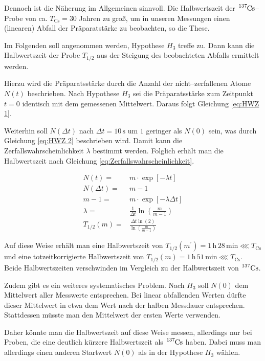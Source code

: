 \documentclass[12pt,a4paper]{scrartcl}
\numberwithin{equation}{section} %
\begin{document}
Dennoch ist die Näherung im Allgemeinen sinnvoll. Die Halbwertszeit der $\ce{^{137}Cs}$--Probe von ca. $T_\mathrm{Cs}=30$ Jahren \cite{Chart of Nuclides}  zu groß, um in unseren Messungen einen (linearen) Abfall der Präparatstärke zu beobachten, so die These.

Im Folgenden soll angenommen werden, Hypothese $H_3$ treffe zu. Dann kann die Halbwertszeit der Probe $T_{1/2}$ aus der Steigung des beobachteten Abfalls ermittelt werden.

Hierzu wird die Präparatsstärke durch die Anzahl der nicht--zerfallenen Atome $N(t)$ beschrieben. Nach Hypothese $H_3$ sei die Präparatsstärke zum Zeitpunkt $t=0$ identisch mit dem gemessenen Mittelwert. Daraus folgt Gleichung \eqref{eq:HWZ 1}.

Weiterhin soll $N(\Delta t)$ nach $\Delta t=10\mathrm{\,s}$ um $1$ geringer als $N(0)$ sein, was durch Gleichung \eqref{eq:HWZ 2} beschrieben wird. Damit kann die Zerfallswahrscheinlichkeit $\lambda$ bestimmt werden. Folglich erhält man die Halbwertszeit nach Gleichung \eqref{eq:Zerfallswahrscheinlichkeit}.

\begin{align}
	N(t) =& m \cdot \exp[-\lambda t] \label{eq:HWZ 1}\\
	N(\Delta t) =& m-1 \\
	m-1 =& m \cdot \exp[-\lambda \Delta t] \label{eq:HWZ 2}\\
	\lambda =& \frac{1}{\Delta t} \ln(\frac{m}{m-1}) \\
	T_{1/2}(m) =& \frac{\Delta t \ln(2)}{\ln(\frac{m}{m-1})}
\end{align}

\noindent
Auf diese Weise erhält man eine Halbwertszeit von $T_{1/2}(m^\prime)=1\,\mathrm{h}\,28\,\mathrm{min}\lll T_\mathrm{Cs}$ und eine totzeitkorrigierte Halbwertszeit von $T_{1/2}(m)=1\,\mathrm{h}\,51\,\mathrm{min}\lll T_\mathrm{Cs}$. Beide Halbwertszeiten verschwinden im Vergleich zu der Halbwertszeit von $\ce{^{137}Cs}$.

Zudem gibt es ein weiteres systematisches Problem. Nach $H_3$ soll $N(0)$ dem Mittelwert aller Messwerte entsprechen. Bei linear abfallenden Werten dürfte dieser Mittelwert in etwa dem Wert nach der halben Messdauer entsprechen. Stattdessen müsste man den Mittelwert der ersten Werte verwenden.

Daher könnte man die Halbwertszeit auf diese Weise messen, allerdings nur bei Proben, die eine deutlich kürzere Halbwertszeit als $\ce{^{137}Cs}$ haben. Dabei muss man allerdings einen anderen Startwert $N(0)$ als in der Hypothese $H_3$ wählen.
\end{document}

